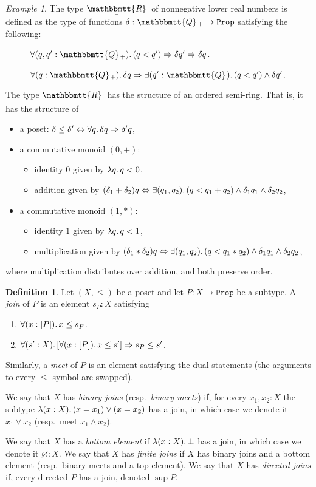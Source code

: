 \documentclass[11pt, oneside, article]{memoir}
\theoremstyle{plain}
\theoremstyle{definition}
\newtheorem{definition}[theorem]{Definition}
\theoremstyle{remark}
\newtheorem{example}[theorem]{Example}
\DeclarePairedDelimiter{\subtype}{[}{]}
\newcommand{\const}[1]{\mathtt{#1}}
\newcommand{\ubar}[1]{\underaccent{\bar}{#1}}
\newcommand{\internal}[1]{\raisebox{-.03ex}{$\mathbbmtt{#1}$}}
\newcommand{\hs}{\hspace{1.1pt}}
\newcommand{\tQQ}{\internal{Q}\hs}
\newcommand{\tQQp}{\tQQ_{+}}
\newcommand{\tRR}{\internal{R}\hs}
\newcommand{\tLR}{\ubar{\tRR}\hs}
\newcommand{\Prop}{\const{Prop}}
\newcommand{\imp}{\Rightarrow}
\renewcommand{\iff}{\Leftrightarrow}
\begin{document}
\begin{example}
The type $\tLR$ of nonnegative lower real numbers is defined as the type of functions $\delta:\tQQp\to\Prop$ satisfying the following:
\begin{description}
	\item[\quad\parbox{1in}{Down-closed:}] $\forall(q,q':\tQQp)\ldotp (q<q')\imp\delta q'\imp\delta q$.
	\item[\quad\parbox{1in}{Rounded:}] $\forall(q:\tQQp)\ldotp\delta q\imp\exists(q':\tQQ)\ldotp(q<q')\wedge\delta q'$.
\end{description}
The type $\tLR$ has the structure of an ordered semi-ring. That is, it has the structure of
\begin{itemize}
	\item a poset: $\delta\leq \delta'\iff\forall q\ldotp\delta q\imp\delta'q$,
	\item a commutative monoid $(0,+)$:
	\begin{itemize}
		\item identity $0$ given by $\lambda q\ldotp q < 0$,
		\item  addition given by $(\delta_1+\delta_2)q\iff\exists(q_1,q_2)\ldotp(q<q_1+q_2)\wedge\delta_1q_1\wedge\delta_2q_2$,
	\end{itemize}
	\item a commutative monoid $(1,*)$:
	\begin{itemize}
		\item identity $1$ given by $\lambda q\ldotp q<1$,
		\item multiplication given by $(\delta_1*\delta_2)q\iff\exists(q_1,q_2)\ldotp(q<q_1*q_2)\wedge\delta_1q_1\wedge\delta_2q_2$,
	\end{itemize}
\end{itemize}
where multiplication distributes over addition, and both preserve order.
\end{example}

\begin{definition}
Let $(X,\leq)$ be a poset and let $P:X\to\Prop$ be a subtype. A \emph{join} of $P$ is an element $s_P:X$ satisfying
\begin{enumerate}
	\item $\forall(x:\subtype{P})\ldotp x\leq s_P$.
	\item $\forall(s':X)\ldotp[\forall(x:\subtype{P})\ldotp x\leq s']\imp s_P\leq s'$.
\end{enumerate}
Similarly, a \emph{meet} of $P$ is an element satisfying the dual statements (the arguments to every $\leq$ symbol are swapped).

We say that $X$ has \emph{binary joins} (resp.\ \emph{binary meets}) if, for every $x_1,x_2:X$ the subtype $\lambda(x:X)\ldotp (x=x_1) \vee (x=x_2)$ has a join, in which case we denote it $x_1\vee x_2$ (resp.\ meet $x_1\wedge x_2$). 

We say that $X$ has a \emph{bottom element} if $\lambda(x:X)\ldotp \bot$ has a join, in which case we denote it $\varnothing:X$. We say that $X$ has \emph{finite joins} if $X$ has binary joins and a bottom element (resp.\ binary meets and a top element). We say that $X$ has \emph{directed joins} if, every directed $P$ has a join, denoted $\sup P$.
\end{definition}
\end{document}
